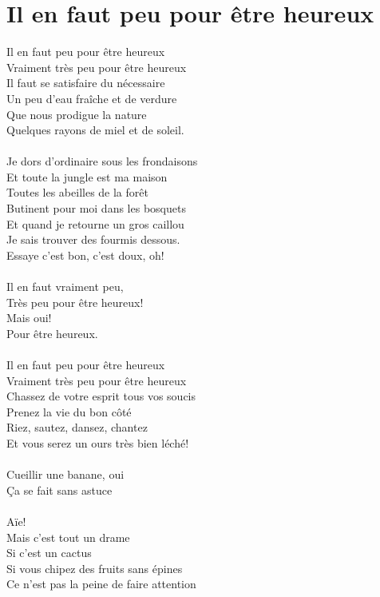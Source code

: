 \section*{Il en faut peu pour être heureux}
Il en faut peu pour être heureux\\
Vraiment très peu pour être heureux\\
Il faut se satisfaire du nécessaire\\
Un peu d'eau fraîche et de verdure\\
Que nous prodigue la nature\\
Quelques rayons de miel et de soleil.\\\\
Je dors d'ordinaire sous les frondaisons\\
Et toute la jungle est ma maison\\
Toutes les abeilles de la forêt\\
Butinent pour moi dans les bosquets\\
Et quand je retourne un gros caillou\\
Je sais trouver des fourmis dessous.\\
Essaye c'est bon, c'est doux, oh!\\\\
Il en faut vraiment peu,\\
Très peu pour être heureux!\\
Mais oui!\\
Pour être heureux.\\\\
Il en faut peu pour être heureux\\
Vraiment très peu pour être heureux\\
Chassez de votre esprit tous vos soucis\\
Prenez la vie du bon côté\\
Riez, sautez, dansez, chantez\\
Et vous serez un ours très bien léché!\\\\
Cueillir une banane, oui\\
Ça se fait sans astuce\\\\
Aïe!\\
Mais c'est tout un drame\\
Si c'est un cactus\\
Si vous chipez des fruits sans épines\\
Ce n'est pas la peine de faire attention\\
